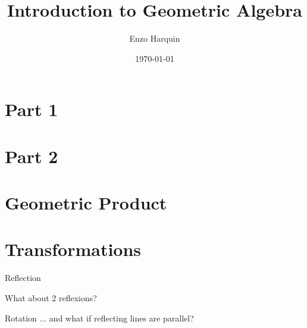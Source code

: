 



\title{Introduction to Geometric Algebra}
\author[Harquin]{Enzo Harquin}
\titlegraphic{}
\date{\today}




\begin{frame}
    \titlepage
\end{frame}



\section{Part 1}


\section{Part 2}



\section{Geometric Product}


\section{Transformations}

\begin{frame}{Reflection}
\end{frame}


\begin{frame}{What about 2 reflexions?}
    \hfill\href{https://enkimute.github.io/ganja.js/examples/coffeeshop.html\#yYimFv544&fullscreen}{}
\end{frame}


\begin{frame}{Rotation}
    ... and what if reflecting lines are parallel? \\
    \hfill\href{https://enkimute.github.io/ganja.js/examples/coffeeshop.html\#yYimFv544&fullscreen}{}
\end{frame}


